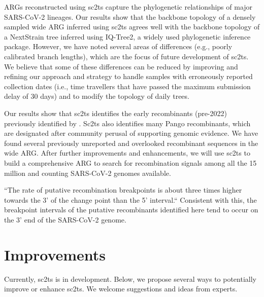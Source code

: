 \documentclass{article}
\begin{document}
ARGs reconstructed using sc2ts capture the phylogenetic relationships of major
SARS-CoV-2 lineages. Our results show that the backbone topology of a densely
sampled wide ARG inferred using sc2ts agrees well with the backbone topology of
a NextStrain tree inferred using IQ-Tree2, a widely used phylogenetic inference
package. However, we have noted several areas of differences (e.g., poorly
calibrated branch lengths), which are the focus of future development of sc2ts.
We believe that some of these differences can be reduced by improving and
refining our approach and strategy to handle samples with erroneously reported
collection dates (i.e., time travellers that have passed the maximum submission
delay of 30 days) and to modify the topology of daily trees.

Our results show that sc2ts identifies the early recombinants (pre-2022)
previously identified by \cite{Jackson2021-ik}. Sc2ts also identifies many
Pango recombinants, which are designated after community perusal of supporting
genomic evidence. We have found several previously unreported and overlooked
recombinant sequences in the wide ARG. After further improvements and
enhancements, we will use sc2ts to build a comprehensive ARG to search for
recombination signals among all the 15 million and counting SARS-CoV-2 genomes
available.

``The rate of putative recombination breakpoints is about three times higher towards the 3' of the change point than the 5' interval.`` Consistent with this, the breakpoint intervals of the putative recombinants identified here tend to occur on the 3’ end of the SARS-CoV-2 genome.

\section{Improvements}
Currently, sc2ts is in development. Below, we propose several ways to potentially improve or enhance sc2ts. We welcome suggestions and ideas from experts.
\end{document}
